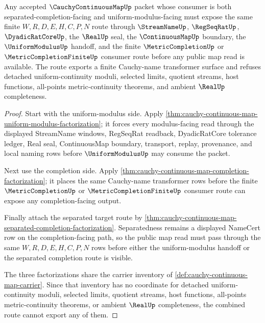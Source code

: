 \begin{theorem}
\label{thm:cauchy-continuous-map-separated-uniform-modulus-completion-route}
Any accepted $\CauchyContinuousMapUp$ packet whose consumer is both separated-completion-facing and uniform-modulus-facing must expose the same finite $W,R,D,E,H,C,P,N$ route through $\StreamNameUp$, $\RegSeqRatUp$, $\DyadicRatCoreUp$, the $\RealUp$ seal, the $\ContinuousMapUp$ boundary, the $\UniformModulusUp$ handoff, and the finite $\MetricCompletionUp$ or $\MetricCompletionFiniteUp$ consumer route before any public map read is available. The route exports a finite Cauchy-name transformer surface and refuses detached uniform-continuity moduli, selected limits, quotient streams, host functions, all-points metric-continuity theorems, and ambient $\RealUp$ completeness.
\end{theorem}
\begin{proof}
Start with the uniform-modulus side. Apply \autoref{thm:cauchy-continuous-map-uniform-modulus-factorization}; it forces every modulus-facing read through the displayed StreamName windows, RegSeqRat readback, DyadicRatCore tolerance ledger, Real seal, ContinuousMap boundary, transport, replay, provenance, and local naming rows before $\UniformModulusUp$ may consume the packet.

Next use the completion side. Apply \autoref{thm:cauchy-continuous-map-completion-factorization}; it places the same Cauchy-name transformer rows before the finite $\MetricCompletionUp$ or $\MetricCompletionFiniteUp$ consumer route can expose any completion-facing output.

Finally attach the separated target route by \autoref{thm:cauchy-continuous-map-separated-completion-factorization}. Separatedness remains a displayed NameCert row on the completion-facing path, so the public map read must pass through the same $W,R,D,E,H,C,P,N$ rows before either the uniform-modulus handoff or the separated completion route is visible.

The three factorizations share the carrier inventory of \autoref{def:cauchy-continuous-map-carrier}. Since that inventory has no coordinate for detached uniform-continuity moduli, selected limits, quotient streams, host functions, all-points metric-continuity theorems, or ambient $\RealUp$ completeness, the combined route cannot export any of them.
\end{proof}

